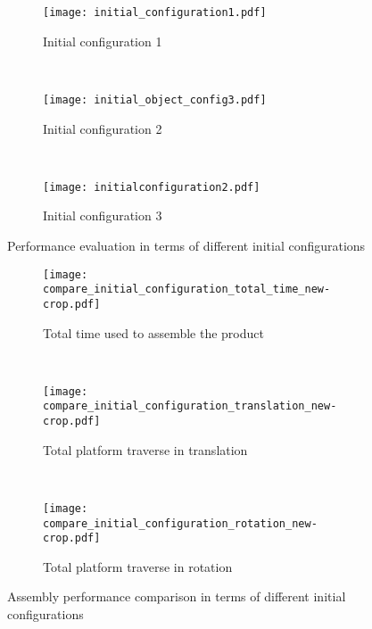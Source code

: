 \begin{figure}[!htbp]
\captionsetup[subfigure]{position=b}
    \centering
    \begin{subfigure}[t]{0.3\textwidth}
        \texttt{[image: initial\_configuration1.pdf]}
        \caption{Initial configuration 1}
        \label{fig:diff_initial_config1}
    \end{subfigure}
    ~
    \begin{subfigure}[t]{0.3\textwidth}
        \texttt{[image: initial\_object\_config3.pdf]}
        \caption{Initial configuration 2 }
        \label{fig:diff_initial_config2}
    \end{subfigure}
    ~
    \begin{subfigure}[t]{0.3\textwidth}
        \texttt{[image: initialconfiguration2.pdf]}
        \caption{Initial configuration 3 }
        \label{fig:diff_initial_config3}
    \end{subfigure}
    \caption{Performance evaluation in terms of different initial  configurations}\label{fig:diff_initial_config_moveit}
\end{figure} 


\begin{figure}[!htbp]
\captionsetup[subfigure]{position=b}
    \centering
    \begin{subfigure}[t]{0.4\textwidth}
        \texttt{[image: compare\_initial\_configuration\_total\_time\_new-crop.pdf]}
        \caption{Total time used to assemble the product}
        \label{fig:diff_initial_total_time}
    \end{subfigure}
    ~
    \begin{subfigure}[t]{0.4\textwidth}
        \texttt{[image: compare\_initial\_configuration\_translation\_new-crop.pdf]}
        \caption{Total platform traverse in translation}
        \label{fig:diff_initial_traverse_translation}
    \end{subfigure}
    ~
    \begin{subfigure}[t]{0.4\textwidth}
        \texttt{[image: compare\_initial\_configuration\_rotation\_new-crop.pdf]}
        \caption{Total platform traverse in rotation}
        \label{fig:diff_initial_traverse_rotation}
    \end{subfigure}
    \caption{Assembly performance comparison in terms of different initial  configurations}\label{fig:diff_initial_config}
\end{figure}

